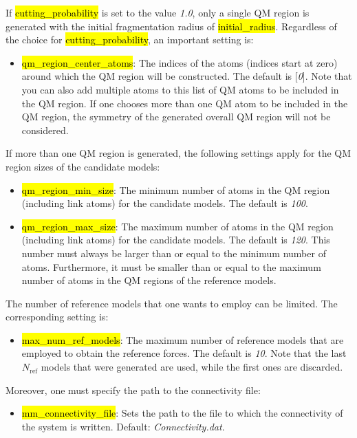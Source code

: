 \documentclass[]{tufte-book}
\begin{document}
{{If \hl{cutting\_probability} is set to the value \textit{1.0}, only a single QM region is generated with the initial fragmentation radius of \hl{initial\_radius}. Regardless of the choice for \hl{cutting\_probability}, an important setting is:

\begin{itemize}
\item \hl{qm\_region\_center\_atoms}: The indices of the atoms (indices start at zero) around which the QM region will be constructed. The default is [\textit{0}]. Note that you can also add multiple atoms to this list of QM atoms to be included in the QM region. If one chooses more than one QM atom to be included in the QM region, the symmetry of the generated overall QM region will not be considered.
\end{itemize}

If more than one QM region is generated, the following settings apply for the QM region sizes of the candidate models:

\begin{itemize}
\item \hl{qm\_region\_min\_size}: The minimum number of atoms in the QM region (including link atoms) for the candidate models. The default is \textit{100}.
\item \hl{qm\_region\_max\_size}: The maximum number of atoms in the QM region (including link atoms) for the candidate models. The default is \textit{120}. This number must always be larger than or equal to the minimum number of atoms. Furthermore, it must be smaller than or equal to the maximum number of atoms in the QM regions of the reference models.
\end{itemize}

The number of reference models that one wants to employ can be limited. The corresponding setting is:

\begin{itemize}
\item \hl{max\_num\_ref\_models}: The maximum number of reference models that are employed to obtain the reference forces. The default is \textit{10}. Note that the last $N_\text{ref}$ models that were generated are used, while the first ones are discarded.
\end{itemize}

Moreover, one must specify the path to the connectivity file:

\begin{itemize}
\item \hl{mm\_connectivity\_file}: Sets the path to the file to which the connectivity of the system is written. Default: \textit{Connectivity.dat}.
\end{itemize}

}}
\end{document}
